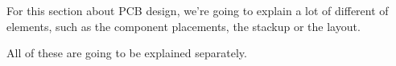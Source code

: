 For this section about PCB design, we're going to explain a lot of different of
elements, such as the component placements, the stackup or the layout.

All of these are going to be explained separately.
